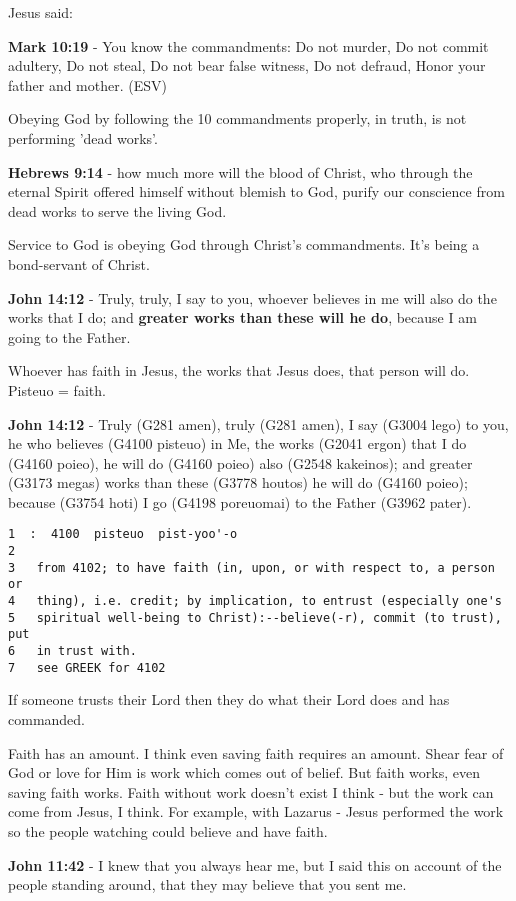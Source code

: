 \documentclass[11pt]{article}
\begin{document}
Jesus said:

\textbf{Mark 10:19} - You know the commandments: Do not murder, Do not commit adultery, Do not steal, Do not bear false witness, Do not defraud, Honor your father and mother. (ESV)

Obeying God by following the 10 commandments properly, in truth, is not performing 'dead works'.

\textbf{Hebrews 9:14} - how much more will the blood of Christ, who through the eternal Spirit offered himself without blemish to God, purify our conscience from dead works to serve the living God.

Service to God is obeying God through Christ's commandments. It's being a bond-servant of Christ.

\textbf{John 14:12} - Truly, truly, I say to you, whoever believes in me will also do the works that I do; and \textbf{greater works than these will he do}, because I am going to the Father.

Whoever has faith in Jesus, the works that Jesus does, that person will do.
Pisteuo = faith.

\textbf{John 14:12} - Truly (G281 amen), truly (G281 amen), I say (G3004 lego) to you, he who believes (G4100 pisteuo) in Me, the works (G2041 ergon) that I do (G4160 poieo), he will do (G4160 poieo) also (G2548 kakeinos); and greater (G3173 megas) works than these (G3778 houtos) he will do (G4160 poieo); because (G3754 hoti) I go (G4198 poreuomai) to the Father (G3962 pater).

\begin{verbatim}
1  :  4100  pisteuo  pist-yoo'-o
2  
3   from 4102; to have faith (in, upon, or with respect to, a person or
4   thing), i.e. credit; by implication, to entrust (especially one's
5   spiritual well-being to Christ):--believe(-r), commit (to trust), put
6   in trust with.
7   see GREEK for 4102
\end{verbatim}

If someone trusts their Lord then they do what their Lord does and has commanded.

Faith has an amount.
I think even saving faith requires an amount.
Shear fear of God or love for Him is work which comes out of belief.
But faith works, even saving faith works.
Faith without work doesn't exist I think - but the work can come from Jesus, I think.
For example, with Lazarus - Jesus performed the work so the people watching could believe and have faith.

\textbf{John 11:42} - I knew that you always hear me, but I said this on account of the people standing around, that they may believe that you sent me.
\end{document}
